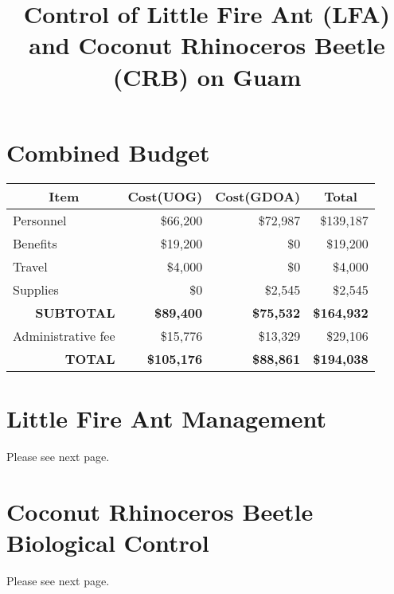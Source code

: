 \documentclass[12pt,letterpaper,english,bibliography=totocnumbered, abstract=on]{scrartcl}
\begin{document}
\titlehead{Grant Proposal: USDA Forest Service FY2020}

\title{Control of Little Fire Ant (LFA) and Coconut Rhinoceros Beetle (CRB) on Guam}

\maketitle
\newpage
\tableofcontents

\pagebreak

\section{Combined Budget}

\begin{table}[h]
	\centering
	\begin{tabular}{@{}lrrr@{}}
		\toprule
		\multicolumn{1}{c}{\textbf{Item}} & \multicolumn{1}{c}{\textbf{Cost(UOG)}} & \multicolumn{1}{c}{\textbf{Cost(GDOA)}} & \multicolumn{1}{c}{\textbf{Total}} \\ \midrule
		Personnel & \$66,200 & \$72,987 & \$139,187 \\
		Benefits & \$19,200 & \$0 & \$19,200 \\
		Travel & \$4,000 & \$0 & \$4,000 \\
		Supplies & \$0 & \$2,545 & \$2,545 \\ \midrule
		\multicolumn{1}{r}{\textbf{SUBTOTAL}} & \textbf{\$89,400} & \textbf{\$75,532} & \textbf{\$164,932} \\ \midrule
		Administrative fee & \$15,776 & \$13,329 & \$29,106 \\ \midrule
		\multicolumn{1}{r}{\textbf{TOTAL}} & \textbf{\$105,176} & \textbf{\$88,861} & \textbf{\$194,038} \\ \bottomrule
	\end{tabular}
\end{table}

\pagebreak
\section{Little Fire Ant Management}
Please see next page.


\section{Coconut Rhinoceros Beetle Biological Control}
Please see next page.

\end{document}
